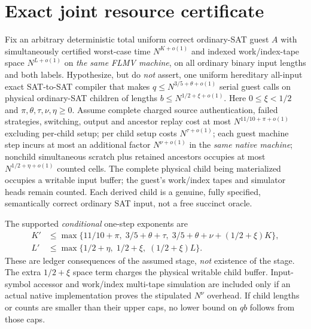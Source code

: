 \documentclass[11pt]{article}
\begin{document}
\section{Exact joint resource certificate}
Fix an arbitrary deterministic total uniform correct ordinary-SAT guest $A$ with simultaneously certified worst-case time $N^{K+o(1)}$ and indexed work/index-tape space $N^{L+o(1)}$ on \emph{the same FLMV machine}, on all ordinary binary input lengths and both labels. Hypothesize, but do \emph{not} assert, one uniform hereditary all-input exact SAT-to-SAT compiler that makes $q\le N^{3/5+\theta+o(1)}$ serial guest calls on physical ordinary-SAT children of lengths $b\le N^{1/2+\xi+o(1)}$. Here $0\le\xi<1/2$ and $\pi,\theta,\tau,\nu,\eta\ge0$. Assume complete charged source authentication, failed strategies, switching, output and ancestor replay cost at most $N^{11/10+\pi+o(1)}$ excluding per-child setup; per child setup costs $N^{\tau+o(1)}$; each guest machine step incurs at most an additional factor $N^{\nu+o(1)}$ in the \emph{same native machine}; nonchild simultaneous scratch plus retained ancestors occupies at most $N^{1/2+\eta+o(1)}$ counted cells. The complete physical child being materialized occupies a writable input buffer; the guest's work/index tapes and simulator heads remain counted. Each derived child is a genuine, fully specified, semantically correct ordinary SAT input, not a free succinct oracle.

The supported \emph{conditional} one-step exponents are
\begin{align}
K'&\le\max\bigl\{11/10+\pi,\;3/5+\theta+\tau,\;3/5+\theta+\nu+(1/2+\xi)K\bigr\},\tag{1}\\
L'&\le\max\bigl\{1/2+\eta,\;1/2+\xi,\;(1/2+\xi)L\bigr\}.\tag{2}
\end{align}
These are ledger consequences of the assumed stage, \emph{not} existence of the stage. The extra $1/2+\xi$ space term charges the physical writable child buffer. Input-symbol accessor and work/index multi-tape simulation are included only if an actual native implementation proves the stipulated $N^\nu$ overhead. If child lengths or counts are smaller than their upper caps, no lower bound on $q b$ follows from those caps.
\end{document}
